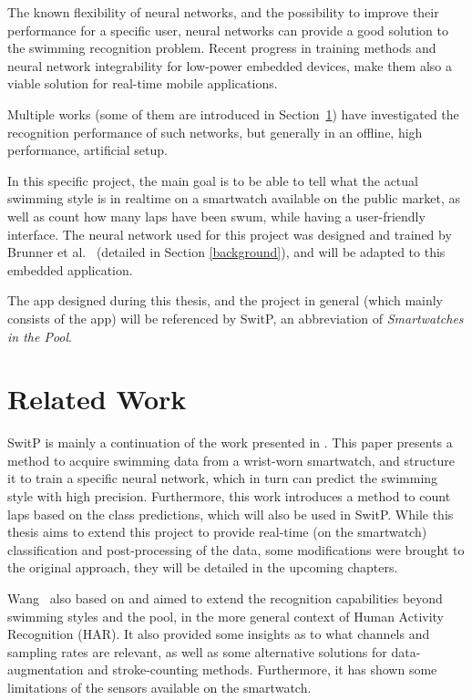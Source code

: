 \documentclass[a4paper, oneside]{discothesis}
\begin{document}
The known flexibility of neural networks, and the possibility to improve their performance for a specific user, neural networks can provide a good solution to the swimming recognition problem. Recent progress in training methods and neural network integrability for low-power embedded devices, make them also a viable solution for real-time mobile applications.

Multiple works (some of them are introduced in Section~\ref{RelWork}) have investigated the recognition performance of such networks, but generally in an offline, high performance, artificial setup. 

In this specific project, the main goal is to be able to tell what the actual swimming style is in realtime on a smartwatch available on the public market, as well as count how many laps have been swum, while having a user-friendly interface. The neural network used for this project was designed and trained by Brunner et al.~\cite{BMSW19} (detailed in Section \ref{background}), and will be adapted to this embedded application.

The app designed during this thesis, and the project in general (which mainly consists of the app) will be referenced by SwitP, an abbreviation of \textit{Smartwatches in the Pool}.


\section{Related Work}\label{RelWork}
SwitP is mainly a continuation of the work presented in \cite{BMSW19}. This paper presents a method to acquire swimming data from a wrist-worn smartwatch, and structure it to train a specific neural network, which in turn can predict the swimming style with high precision. Furthermore, this work introduces a method to count laps based on the class predictions, which will also be used in SwitP. While this thesis aims to extend this project to provide real-time (on the smartwatch) classification and post-processing of the data, some modifications were brought to the original approach, they will be detailed in the upcoming chapters.

Wang~\cite{WANG19} also based on \cite{BMSW19} and aimed to extend the recognition capabilities beyond swimming styles and the pool, in the more general context of Human Activity Recognition (HAR). It also provided some insights as to what channels and sampling rates are relevant, as well as some alternative solutions for data-augmentation and stroke-counting methods. Furthermore, it has shown some limitations of the sensors available on the smartwatch.
\end{document}
